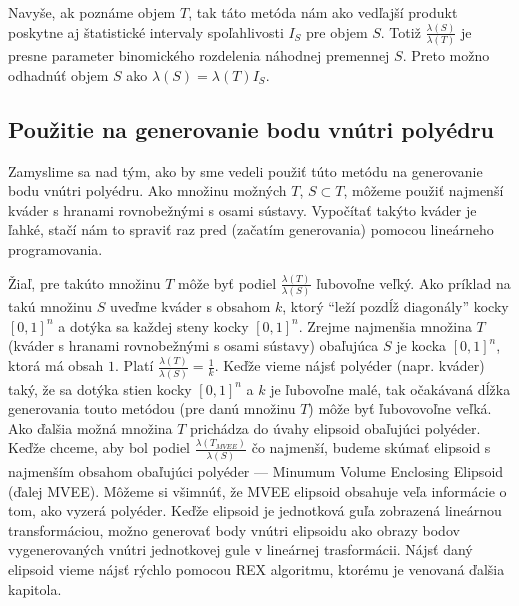 Navyše, ak poznáme objem $T$, tak táto metóda nám ako vedľajší produkt poskytne aj štatistické intervaly spoľahlivosti $I_S$ pre objem $S$. Totiž $\frac{\lambda(S)}{\lambda(T)}$ je presne parameter binomického rozdelenia náhodnej premennej $S$. Preto možno odhadnúť objem $S$ ako $\lambda(S)=\lambda(T)I_S$.

\subsection{Použitie na generovanie bodu vnútri polyédru}

Zamyslime sa nad tým, ako by sme vedeli použiť túto metódu na generovanie bodu vnútri polyédru. Ako množinu možných $T$, $S \subset T$, môžeme použiť najmenší kváder s hranami rovnobežnými s osami sústavy. Vypočítať takýto kváder je ľahké, stačí nám to spraviť raz pred (začatím generovania) pomocou lineárneho programovania.

Žiaľ, pre takúto množinu $T$ môže byť podiel $\frac{\lambda(T)}{\lambda(S)}$ ľubovoľne veľký. Ako príklad na takú množinu $S$ uveďme kváder s obsahom $k$, ktorý ``leží pozdĺž diagonály'' kocky $[0,1]^n$ a dotýka sa každej steny kocky $[0,1]^n$. Zrejme najmenšia množina $T$ (kváder s hranami rovnobežnými s osami sústavy) obaľujúca $S$ je kocka $[0,1]^n$, ktorá má obsah $1$. Platí $\frac{\lambda(T)}{\lambda(S)}=\frac{1}{k}$. Keďže vieme nájsť polyéder (napr. kváder) taký, že sa dotýka stien kocky $[0,1]^n$ a $k$ je ľubovoľne malé, tak očakávaná dĺžka generovania touto metódou (pre danú množinu $T$) môže byť ľubovovoľne veľká.\\

Ako ďalšia možná množina $T$ prichádza do úvahy elipsoid obaľujúci polyéder. Keďže chceme, aby bol podiel $\frac{\lambda(T_{MVEE})}{\lambda(S)}$ čo najmenší, budeme skúmať elipsoid s najmenším obsahom obaľujúci polyéder --- Minumum Volume Enclosing Elipsoid (ďalej MVEE). Môžeme si všimnúť, že MVEE elipsoid obsahuje veľa informácie o tom, ako vyzerá polyéder. Keďže elipsoid je jednotková guľa zobrazená lineárnou transformáciou, možno generovať body vnútri elipsoidu ako obrazy bodov vygenerovaných vnútri jednotkovej gule v lineárnej trasformácii. Nájsť daný elipsoid vieme nájsť rýchlo pomocou REX algoritmu, ktorému je venovaná ďalšia kapitola.

